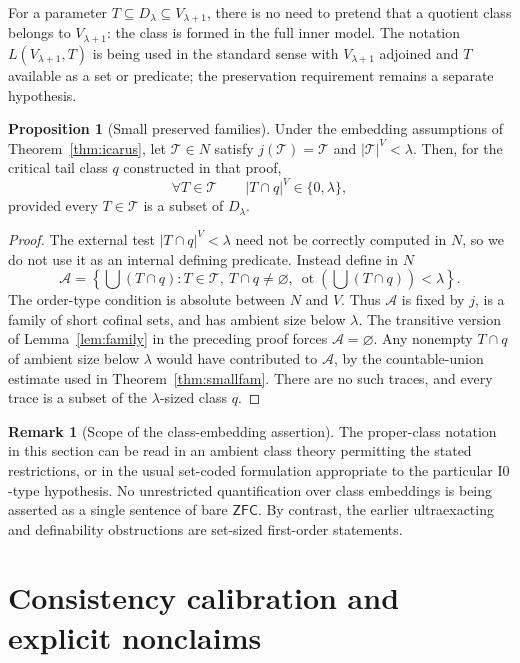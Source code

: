 \documentclass[11pt,letterpaper]{article}
\theoremstyle{definition}
\newtheorem{proposition}[definition]{Proposition}
\newtheorem{remark}[definition]{Remark}
\numberwithin{equation}{section}
\newcommand{\ZFC}{\mathsf{ZFC}}
\newcommand{\ot}{\operatorname{ot}}
\newcommand{\Izero}{\mathrm{I0}}
\newcommand{\D}{D_\lambda}
\begin{document}
For a parameter $T\subseteq\D\subseteq V_{\lambda+1}$, there is no need to pretend that a quotient class belongs to $V_{\lambda+1}$: the class is formed in the full inner model. The notation $L(V_{\lambda+1},T)$ is being used in the standard sense with $V_{\lambda+1}$ adjoined and $T$ available as a set or predicate; the preservation requirement remains a separate hypothesis.

\begin{proposition}[Small preserved families]\label{prop:icarusfamily}
Under the embedding assumptions of Theorem~\ref{thm:icarus}, let $\mathcal T\in N$ satisfy $j(\mathcal T)=\mathcal T$ and $|\mathcal T|^V<\lambda$. Then, for the critical tail class $q$ constructed in that proof,
\[
\forall T\in\mathcal T\qquad |T\cap q|^V\in\{0,\lambda\},
\]
provided every $T\in\mathcal T$ is a subset of $\D$.
\end{proposition}
\begin{proof}
The external test $|T\cap q|^V<\lambda$ need not be correctly computed in $N$, so we do not use it as an internal defining predicate. Instead define in $N$
\[
\mathcal A=\left\{\bigcup(T\cap q):T\in\mathcal T,\ T\cap q\ne\varnothing,
\ \ot\!\left(\bigcup(T\cap q)\right)<\lambda\right\}.
\]
The order-type condition is absolute between $N$ and $V$. Thus $\mathcal A$ is fixed by $j$, is a family of short cofinal sets, and has ambient size below $\lambda$. The transitive version of Lemma~\ref{lem:family} in the preceding proof forces $\mathcal A=\varnothing$. Any nonempty $T\cap q$ of ambient size below $\lambda$ would have contributed to $\mathcal A$, by the countable-union estimate used in Theorem~\ref{thm:smallfam}. There are no such traces, and every trace is a subset of the $\lambda$-sized class $q$.
\end{proof}

\begin{remark}[Scope of the class-embedding assertion]
The proper-class notation in this section can be read in an ambient class theory permitting the stated restrictions, or in the usual set-coded formulation appropriate to the particular $\Izero$-type hypothesis. No unrestricted quantification over class embeddings is being asserted as a single sentence of bare $\ZFC$. By contrast, the earlier ultraexacting and definability obstructions are set-sized first-order statements.
\end{remark}

\section{Consistency calibration and explicit nonclaims}\label{sec:consistency}
\end{document}

